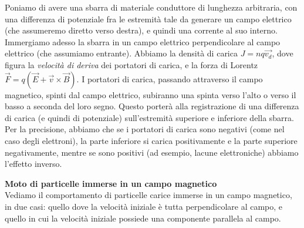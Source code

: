 \documentclass[a4paper,12pt]{article}
\begin{document}
Poniamo di avere una sbarra di materiale conduttore di lunghezza arbitraria, con una differenza di potenziale fra le estremità tale da generare un campo
elettrico (che assumeremo diretto verso destra), e quindi una corrente al suo interno. Immergiamo adesso la sbarra in un campo elettrico perpendicolare
al campo elettrico (che assumiamo entrante). Abbiamo la densità di carica $J = nq\vec{v_d}$, dove figura la \textit{velocità di deriva} dei portatori
di carica, e la forza di Lorentz $\vec{F} = q(\vec{E} + \vec{v} \times \vec{B})$. I portatori di carica, passando attraverso il campo magnetico, spinti dal
campo elettrico, subiranno una spinta verso l'alto o verso il basso a seconda del loro segno. Questo porterà alla registrazione
di una differenza di carica (e quindi di potenziale) sull'estremità superiore e inferiore della sbarra. Per la precisione, abbiamo che se i portatori
di carica sono negativi (come nel caso degli elettroni), la parte inferiore si carica positivamente e la parte superiore negativamente, mentre se
sono positivi (ad esempio, lacune elettroniche) abbiamo l'effetto inverso.
\par\smallskip
\textbf{Moto di particelle immerse in un campo magnetico} \\
Vediamo il comportamento di particelle carice immerse in un campo magnetico, in due casi: quello dove la velocità iniziale è
tutta perpendicolare al campo, e quello in cui la velocità iniziale possiede una componente parallela al campo.
\end{document}
